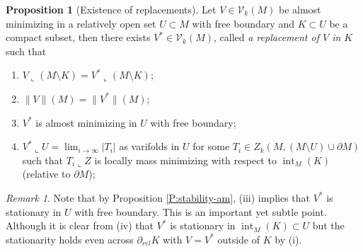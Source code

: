 \documentclass[10pt]{amsart}
\theoremstyle{definition}
\newtheorem{proposition}[theorem]{Proposition}
\theoremstyle{remark}
\newtheorem{remark}[theorem]{Remark}
\numberwithin{equation}{section}
\newcommand{\V}{\mathcal{V}}
\newcommand{\lc}{\llcorner}
\newcommand{\M}{\mathbf{M}}
\newcommand{\spt}{\operatorname{spt}}
\newcommand{\interior}{\operatorname{int}}
\begin{document}
\begin{proposition}[Existence of replacements]
\label{P:good-replacement-property}
Let $V\in\V_k(M)$ be almost minimizing in a relatively open set $U \subset M$ with free boundary and $K \subset U$ be a compact subset, then there exists $V^{*}\in \V_k(M)$, called \emph{a replacement of $V$ in $K$} such that
\begin{enumerate}
\item[(i)] $V\lc (M\setminus K) =V^{*}\lc (M\setminus K)$;
\item[(ii)] $\|V\|(M)=\|V^{*}\|(M)$;
\item[(iii)] $V^{*}$ is almost minimizing in $U$ with free boundary;
\item[(iv)] $V^{*} \lc U =\lim_{i \to \infty} |T_i|$ as varifolds in $U$ for some $T_i\in Z_k(M,(M \setminus U) \cup \partial M)$ such that $T_i \lc Z$ is locally mass minimizing with respect to $\interior_M(K)$ (relative to $\partial M$);
\end{enumerate}
\end{proposition}

\begin{remark}
\label{remark:replacement}
Note that by Proposition \ref{P:stability-am}, (iii) implies that $V^*$ is stationary in $U$ with free boundary. This is an important yet subtle point. Although it is clear from (iv) that $V^*$ is stationary in $\interior_M(K) \subset U$ but the stationarity holds even across $\partial_{rel}K$ with $V=V^*$ outside of $K$ by (i). 
\end{remark}
\end{document}
